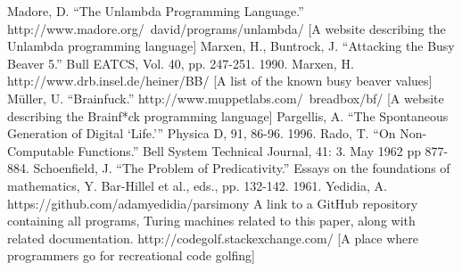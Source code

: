 \documentclass[11pt]{article}
\begin{document}
\begin{thebibliography}{100}
 Madore, D. ``The Unlambda Programming Language.'' http://www.madore.org/~david/programs/unlambda/ [A website describing the Unlambda programming language]
 Marxen, H., Buntrock, J. ``Attacking the Busy Beaver 5.'' Bull EATCS, Vol. 40, pp. 247-251. 1990.
 Marxen, H. http://www.drb.insel.de/heiner/BB/ [A list of the known busy beaver values]
 M\"uller, U. ``Brainfuck.'' http://www.muppetlabs.com/~breadbox/bf/ [A website describing the Brainf*ck programming language]
 Pargellis, A. ``The Spontaneous Generation of Digital {`Life.'}'' Physica D, 91, 86-96. 1996.
 Rado, T. ``On Non-Computable Functions.'' Bell System Technical Journal, 41: 3. May 1962 pp 877-884.
 Schoenfield, J. ``The Problem of Predicativity.'' Essays on the foundations of mathematics, Y. Bar-Hillel et al., eds., pp. 132-142. 1961.
 Yedidia, A. https://github.com/adamyedidia/parsimony A link to a GitHub repository containing all programs, Turing machines related to this paper, along with related documentation.
 http://codegolf.stackexchange.com/ [A place where programmers go for recreational code golfing]
\end{thebibliography}
\end{document}
